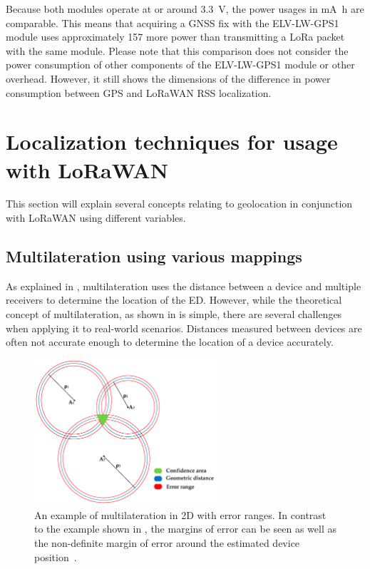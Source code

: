 Because both modules operate at or around \SI{3.3}{\volt}, the power usages in \si{\milli\ampere\hour} are comparable.
This means that acquiring a \ac{GNSS} fix with the ELV-LW-GPS1 module uses approximately \SI{157}{\times} more power than transmitting a \ac{LoRa} packet with the same module.
Please note that this comparison does not consider the power consumption of other components of  the ELV-LW-GPS1 module or other overhead.
However, it still shows the dimensions of the difference in power consumption between \ac{GPS} and \ac{LoRaWAN} \ac{RSS} localization.

\section{Localization techniques for usage with \acs{LoRaWAN}}\label{sec:lorawan-localization-techniques}

This section will explain several concepts relating to geolocation in conjunction with \ac{LoRaWAN} using different variables.

\subsection{Multilateration using various mappings}\label{sec:lorawan-multilateration}

As explained in , multilateration uses the distance between a device and multiple receivers to determine the location of the \acl{ED}.
However, while the theoretical concept of multilateration, as shown in  is simple, there are several challenges when applying it to real-world scenarios.
Distances measured between devices are often not accurate enough to determine the location of a device accurately.

\begin{figure}[htbp]
    \centering
    \includegraphics[width=0.6\textwidth]{pictures/multilateration/multilateration_error_ranges.png}
    \caption[Example of multilateration in 2D with error ranges]{
        An example of multilateration in 2D with error ranges.
        In contrast to the example shown in , the margins of error can be seen as well as the non-definite margin of error around the estimated device position~\protect\cite{kapoor_novel_2016}.
    }\label{pic:multilateration-with-error-ranges-example}
\end{figure}

